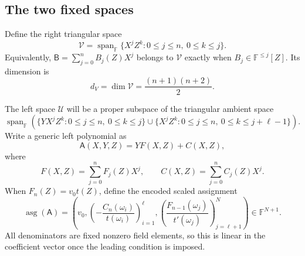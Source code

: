 \documentclass[11pt]{article}
\theoremstyle{definition}
\newcommand{\F}{\mathbb F}
\newcommand{\cU}{\mathcal U}
\newcommand{\cV}{\mathcal V}
\newcommand{\Span}{\operatorname{span}}
\newcommand{\asg}{\operatorname{asg}}
\begin{document}
\subsection{The two fixed spaces}

Define the right triangular space
\begin{equation}
  \cV
  =\Span_{\F}\{X^jZ^k:0\le j\le n,\ 0\le k\le j\}.
  \label{eq:fsp-right-space}
\end{equation}
Equivalently, $\mathsf B=\sum_{j=0}^nB_j(Z)X^j$ belongs to $\cV$ exactly when
$B_j\in\F^{\le j}[Z]$.  Its dimension is
\begin{equation}
  d_V=\dim\cV=\frac{(n+1)(n+2)}2.
  \label{eq:fsp-right-dimension}
\end{equation}

The left space $\cU$ will be a proper subspace of the triangular ambient space
\[
  \Span_{\F}\!\left(
    \{YX^jZ^k:0\le j\le n,\ 0\le k\le j\}
    \cup
    \{X^jZ^k:0\le j\le n,\ 0\le k\le j+\ell-1\}
  \right).
\]
Write a generic left polynomial as
\begin{equation}
  \mathsf A(X,Y,Z)=YF(X,Z)+C(X,Z),
  \label{eq:fsp-generic-left}
\end{equation}
where
\[
  F(X,Z)=\sum_{j=0}^{n}F_j(Z)X^j,
  \qquad
  C(X,Z)=\sum_{j=0}^{n}C_j(Z)X^j.
\]
When $F_n(Z)=v_0t(Z)$, define the encoded scaled assignment
\begin{equation}
  \asg(\mathsf A)
  =\left(
      v_0,
      \left(-\frac{C_n(\omega_i)}{t(\omega_i)}\right)_{i=1}^{\ell},
      \left(\frac{F_{n-1}(\omega_j)}{t'(\omega_j)}\right)_{j=\ell+1}^{N}
    \right)
  \in\F^{N+1}.
  \label{eq:fsp-assignment-map}
\end{equation}
All denominators are fixed nonzero field elements, so this is linear in the
coefficient vector once the leading condition is imposed.
\end{document}
